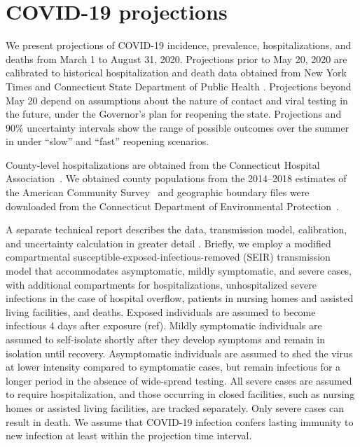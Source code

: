 \documentclass[11pt]{article}
\begin{document}

\section*{COVID-19 projections} 

We present projections of COVID-19 incidence, prevalence, hospitalizations, and deaths from March 1 to August 31, 2020.  Projections prior to May 20, 2020 are calibrated to historical hospitalization and death data obtained from New York Times \citep{nyt2020Connecticut} and Connecticut State Department of Public Health \citep{DPHwebsite}. Projections beyond May 20 depend on assumptions about the nature of contact and viral testing in the future, under the Governor's plan for reopening the state.  Projections and 90\% uncertainty intervals show the range of possible outcomes over the summer in under ``slow'' and ``fast'' reopening scenarios.  


County-level hospitalizations are obtained from the Connecticut Hospital Association~\citep{CHAwebsite}. We obtained county populations from the 2014--2018 estimates of the American Community Survey~\citep{acs2018} and geographic boundary files were downloaded from the Connecticut Department of Environmental Protection~\citep{shapefile}. 

A separate technical report describes the data, transmission model, calibration, and uncertainty calculation in greater detail \citep{morozova2020tech}.  Briefly, we employ a modified compartmental susceptible-exposed-infectious-removed (SEIR) transmission model that accommodates asymptomatic, mildly symptomatic, and severe cases, with additional compartments for hospitalizations, unhospitalized severe infections in the case of hospital overflow, patients in nursing homes and assisted living facilities, and deaths. 
Exposed individuals are assumed to become infectious 4 days after exposure (ref). Mildly symptomatic individuals are assumed to self-isolate shortly after they develop symptoms and remain in isolation until recovery. Asymptomatic individuals are assumed to shed the virus at lower intensity compared to symptomatic cases, but remain infectious for a longer period in the absence of wide-spread testing. All severe cases are assumed to require hospitalization, and those occurring in closed facilities, such as nursing homes or assisted living facilities, are tracked separately. Only severe cases can result in death.  We assume that COVID-19 infection confers lasting immunity to new infection at least within the projection time interval.  
\end{document}
